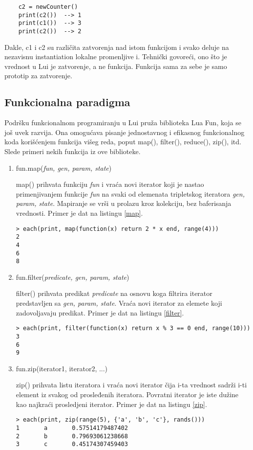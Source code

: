 \documentclass[a4paper]{article}
\begin{document}
\begin{verbatim}
    c2 = newCounter()
    print(c2())  --> 1
    print(c1())  --> 3
    print(c2())  --> 2
\end{verbatim}
Dakle, c1 i c2 su različita zatvorenja nad istom funkcijom i svako deluje na nezavisnu instantiation lokalne promenljive i. Tehnički govoreći, ono što je vrednost u Lui je zatvorenje, a ne funkcija. Funkcija sama za sebe je samo prototip za zatvorenje.

\subsection{Funkcionalna paradigma}
Podršku funkcionalnom programiranju u Lui pruža biblioteka Lua Fun, koja se još uvek razvija. Ona omogućava pisanje jednostavnog i efikasnog funkcionalnog koda korišćenjem funkcija višeg reda, poput map(), filter(), reduce(), zip(), itd. Slede primeri nekih funkcija iz ove biblioteke.


\begin{enumerate}
  \item  fun.map(\textit{fun, gen, param, state})
  
  map() prihvata funkciju \textit{fun} i vraća novi iterator koji je nastao primenjivanjem funkcije \textit{fun} na svaki od elemenata tripletskog iteratora \textit{gen, param, state}. Mapiranje se vrši u prolazu kroz kolekciju, bez baferisanja vrednosti. Primer je dat na listingu \ref{map}. \cite{luafun}
   \begin{lstlisting}[caption={Primer funkcije map()},frame=single, label=map]
> each(print, map(function(x) return 2 * x end, range(4)))
2
4
6
8
\end{lstlisting}
  \item fun.filter(\textit{predicate, gen, param, state})
  
  filter() prihvata predikat \textit{predicate} na osnovu koga filtrira iterator predstavljen sa \textit{gen, param, state}. Vraća novi iterator za elemete koji zadovoljavaju predikat. Primer je dat na listingu \ref{filter}. \cite{luafun}
   \begin{lstlisting}[caption={Primer funkcije filter()},frame=single, label=filter]
> each(print, filter(function(x) return x % 3 == 0 end, range(10)))
3
6
9
\end{lstlisting}
\item fun.zip(iterator1, iterator2, ...)

   zip() prihvata listu iteratora i vraća novi iterator čija i-ta vrednost sadrži i-ti element iz svakog od prosleđenih iteratora. Povratni iterator je iste dužine kao najkraći prosledjeni iterator. Primer je dat na listingu \ref{zip}. \cite{luafun}
   \begin{lstlisting}[caption={Primer funkcije zip()},frame=single, label=zip]
> each(print, zip(range(5), {'a', 'b', 'c'}, rands()))
1       a       0.57514179487402
2       b       0.79693061238668
3       c       0.45174307459403
\end{lstlisting}
\end{enumerate}
\end{document}

